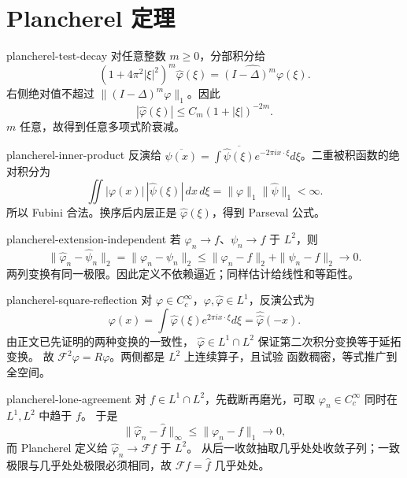 \chapter{Plancherel 定理}

\begin{solution}{plancherel-test-decay}
对任意整数 \(m\ge0\)，分部积分给
\[
 (1+4\pi^2|\xi|^2)^m\widehat\varphi(\xi)
 =\widehat{(I-\Delta)^m\varphi}(\xi).
\]
右侧绝对值不超过
\(\|(I-\Delta)^m\varphi\|_1\)。因此
\[
 |\widehat\varphi(\xi)|\le C_m(1+|\xi|)^{-2m}.
\]
\(m\) 任意，故得到任意多项式阶衰减。
\end{solution}

\begin{solution}{plancherel-inner-product}
反演给
\(\overline{\psi(x)}=\int\overline{\widehat\psi(\xi)}
e^{-2\pi ix\cdot\xi}d\xi\)。二重被积函数的绝对积分为
\[
 \iint|\varphi(x)|\,|\widehat\psi(\xi)|\,dx\,d\xi
 =\|\varphi\|_1\|\widehat\psi\|_1<\infty.
\]
所以 Fubini 合法。换序后内层正是 \(\widehat\varphi(\xi)\)，得到 Parseval
公式。
\end{solution}

\begin{solution}{plancherel-extension-independent}
若 \(\varphi_n\to f\)、\(\psi_n\to f\) 于 \(L^2\)，则
\[
 \|\widehat\varphi_n-\widehat\psi_n\|_2
 =\|\varphi_n-\psi_n\|_2
 \le\|\varphi_n-f\|_2+\|\psi_n-f\|_2\to0.
\]
两列变换有同一极限。因此定义不依赖逼近；同样估计给线性和等距性。
\end{solution}

\begin{solution}{plancherel-square-reflection}
对 \(\varphi\in C_c^\infty\)，\(\varphi,\widehat\varphi\in L^1\)，反演公式为
\[
 \varphi(x)=\int\widehat\varphi(\xi)e^{2\pi ix\cdot\xi}d\xi
 =\widehat{\widehat\varphi}(-x).
\]
由正文已先证明的两种变换的一致性，
\(\widehat\varphi\in L^1\cap L^2\) 保证第二次积分变换等于延拓变换。
故 \(\mathcal F^2\varphi=R\varphi\)。两侧都是 \(L^2\) 上连续算子，且试验
函数稠密，等式推广到全空间。
\end{solution}

\begin{solution}{plancherel-lone-agreement}
对 \(f\in L^1\cap L^2\)，先截断再磨光，可取
\(\varphi_n\in C_c^\infty\) 同时在 \(L^1,L^2\) 中趋于 \(f\)。
于是
\[
 \|\widehat\varphi_n-\widehat f\|_\infty\le\|\varphi_n-f\|_1\to0,
\]
而 Plancherel 定义给 \(\widehat\varphi_n\to\mathcal Ff\) 于 \(L^2\)。
从后一收敛抽取几乎处处收敛子列；一致极限与几乎处处极限必须相同，故
\(\mathcal Ff=\widehat f\) 几乎处处。
\end{solution}


